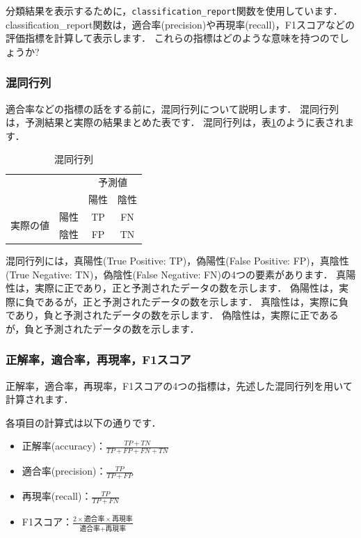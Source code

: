 \documentclass{jarticle}
\begin{document}
分類結果を表示するために，\texttt{classification\_report}関数を使用しています．
classification\_report関数は，適合率(precision)や再現率(recall)，F1スコアなどの評価指標を計算して表示します．
これらの指標はどのような意味を持つのでしょうか?

\subsubsection{混同行列}
適合率などの指標の話をする前に，混同行列について説明します．
混同行列は，予測結果と実際の結果まとめた表です．
混同行列は，表\ref{tb:confusion_matrix}のように表されます．

\begin{table}[H]
  \centering
  \caption{混同行列}
  \label{tb:confusion_matrix}
  \begin{tabular}{c|c|c c}\hline
    \multicolumn{2}{c}{} & \multicolumn{2}{|c}{予測値} \\
    \cline{3-4}
    \multicolumn{1}{c}{} &  & 陽性 & 陰性 \\
    \hline
    \multirow{2}{*}{実際の値} & 陽性 & TP & FN \\
    & 陰性 & FP & TN \\
    \hline
  \end{tabular}
\end{table}

混同行列には，真陽性(True Positive: TP)，偽陽性(False Positive: FP)，真陰性(True Negative: TN)，偽陰性(False Negative: FN)の4つの要素があります．
真陽性は，実際に正であり，正と予測されたデータの数を示します．
偽陽性は，実際に負であるが，正と予測されたデータの数を示します．
真陰性は，実際に負であり，負と予測されたデータの数を示します．
偽陰性は，実際に正であるが，負と予測されたデータの数を示します．

\subsubsection{正解率，適合率，再現率，F1スコア}
正解率，適合率，再現率，F1スコアの4つの指標は，先述した混同行列を用いて計算されます．

各項目の計算式は以下の通りです．

\begin{itemize}
  \item 正解率(accuracy)：$\frac{TP + TN}{TP + FP + FN + TN}$
  \item 適合率(precision)：$\frac{TP}{TP + FP}$
  \item 再現率(recall)：$\frac{TP}{TP + FN}$
  \item F1スコア：$\frac{2 \times \text{適合率} \times \text{再現率}}{\text{適合率} + \text{再現率}}$
\end{itemize}
\end{document}
